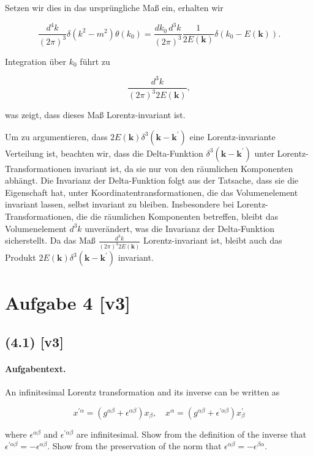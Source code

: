 \documentclass[11pt,a4paper]{article}
\begin{document}
Setzen wir dies in das ursprüngliche Maß ein, erhalten wir

\[
\frac{d^4 k}{(2 \pi)^3} \delta\left(k^2 - m^2\right) \theta\left(k_0\right) = \frac{dk_0 \, d^3 k}{(2 \pi)^3} \frac{1}{2E(\mathbf{k})} \delta\left(k_0 - E(\mathbf{k})\right).
\]

Integration über $k_0$ führt zu

\[
\frac{d^3 k}{(2 \pi)^3 2E(\mathbf{k})},
\]

was zeigt, dass dieses Maß Lorentz-invariant ist.

Um zu argumentieren, dass $2 E(\mathbf{k}) \delta^3\left(\mathbf{k} - \mathbf{k}^{\prime}\right)$ eine Lorentz-invariante Verteilung ist, beachten wir, dass die Delta-Funktion $\delta^3\left(\mathbf{k} - \mathbf{k}^{\prime}\right)$ unter Lorentz-Transformationen invariant ist, da sie nur von den räumlichen Komponenten abhängt. Die Invarianz der Delta-Funktion folgt aus der Tatsache, dass sie die Eigenschaft hat, unter Koordinatentransformationen, die das Volumenelement invariant lassen, selbst invariant zu bleiben. Insbesondere bei Lorentz-Transformationen, die die räumlichen Komponenten betreffen, bleibt das Volumenelement $d^3 k$ unverändert, was die Invarianz der Delta-Funktion sicherstellt. Da das Maß $\frac{d^3 k}{(2 \pi)^3 2 E(\mathbf{k})}$ Lorentz-invariant ist, bleibt auch das Produkt $2 E(\mathbf{k}) \delta^3\left(\mathbf{k} - \mathbf{k}^{\prime}\right)$ invariant.

\section*{Aufgabe 4 [v3]}
\subsection*{(4.1) [v3]}
\paragraph{Aufgabentext.}
An infinitesimal Lorentz transformation and its inverse can be written as

$$
x^{\prime \alpha}=\left(g^{\alpha \beta}+\epsilon^{\alpha \beta}\right) x_\beta, \quad x^\alpha=\left(g^{\alpha \beta}+\epsilon^{\prime \alpha \beta}\right) x_\beta^{\prime}
$$

where $\epsilon^{\alpha \beta}$ and $\epsilon^{\prime \alpha \beta}$ are infinitesimal. Show from the definition of the inverse that $\epsilon^{\prime \alpha \beta}=- \epsilon^{\alpha \beta}$. Show from the preservation of the norm that $\epsilon^{\alpha \beta}=-\epsilon^{\beta \alpha}$.
\end{document}
